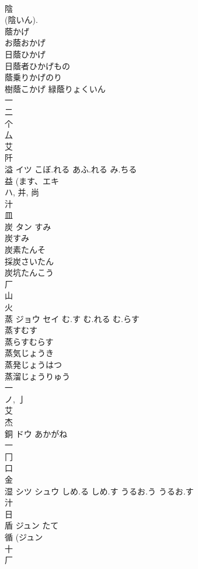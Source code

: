 \documentclass[8pt]{extreport}
\begin{document}
\begin{CJK}{UTF8}{min}
\\	陰 
\\	(陰いん).
\\	蔭かげ 
\\	お蔭おかげ 
\\	日蔭ひかげ 
\\	日蔭者ひかげもの 
\\	蔭乗りかげのり 
\\	樹蔭こかげ 緑蔭りょくいん 
\\	一 
\\	二 
\\	个 
\\	厶 
\\	艾 
\\	阡 
\\	溢	イツ	こぼ.れる あふ.れる み.ちる	
\\	益 (ます、エキ 
\\	ハ, 并, 尚 
\\	汁 
\\	皿 
\\	炭	タン	すみ	
\\	炭すみ
\\	炭素たんそ
\\	採炭さいたん
\\	炭坑たんこう
\\	厂 
\\	山 
\\	火 
\\	蒸	ジョウ セイ	む.す む.れる む.らす	
\\	蒸すむす
\\	蒸らすむらす
\\	蒸気じょうき
\\	蒸発じょうはつ
\\	蒸溜じょうりゅう
\\	一 
\\	ノ, 亅 
\\	艾 
\\	杰	
\\	銅	ドウ	あかがね	
\\	一 
\\	冂 
\\	口 
\\	金 
\\	湿	シツ シュウ	しめ.る しめ.す うるお.う うるお.す	
\\	汁 
\\	日 
\\	盾	ジュン	たて	
\\	循 (ジュン 
\\	十 
\\	厂 

\end{CJK}
\end{document}
